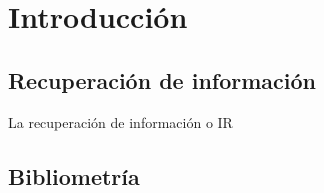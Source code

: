 \chapter*{}
\chapter{Introducción}
\section{Recuperación de información}
La recuperación de información o IR

\section{Bibliometría}


